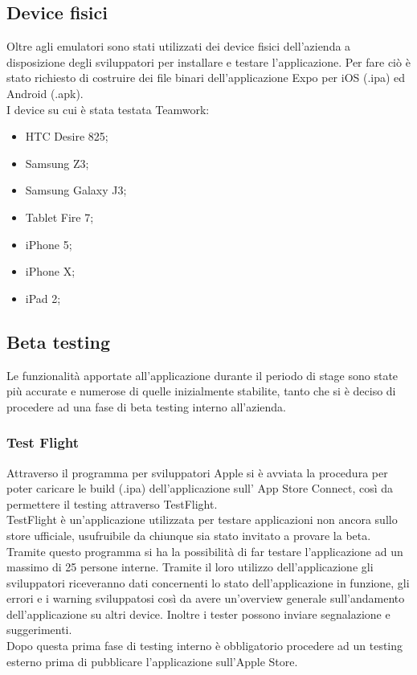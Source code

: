 \subsection{Device fisici}
Oltre agli emulatori sono stati utilizzati dei device fisici dell'azienda a disposizione degli sviluppatori per installare e testare l'applicazione. Per fare ciò è stato richiesto di costruire dei file binari dell'applicazione Expo per iOS (.ipa) ed Android (.apk). \\
I device su cui è stata testata Teamwork:
\begin{itemize}
	\item HTC Desire 825;
	\item Samsung Z3;
	\item Samsung Galaxy J3;
	\item Tablet Fire 7;
	\item iPhone 5;
	\item iPhone X;
	\item iPad 2;
\end{itemize}

\subsection{Beta testing}
Le funzionalità apportate all'applicazione durante il periodo di stage sono state più accurate e numerose di quelle inizialmente stabilite, tanto che si è deciso di procedere ad una fase di beta testing interno all'azienda.\\
\subsubsection{Test Flight}
Attraverso il programma per sviluppatori Apple si è avviata la procedura per poter caricare le build (.ipa) dell'applicazione sull' App Store Connect, così da permettere il testing attraverso TestFlight.\\
TestFlight è un'applicazione utilizzata per testare applicazioni non ancora sullo store ufficiale, usufruibile da chiunque sia stato invitato a provare la beta. Tramite questo programma si ha la possibilità di far testare l'applicazione ad un massimo di 25 persone interne. 
Tramite il loro utilizzo dell'applicazione gli sviluppatori riceveranno dati concernenti lo stato dell'applicazione in funzione, gli errori e i warning sviluppatosi così da avere un'overview generale sull'andamento dell'applicazione su altri device. Inoltre i tester possono inviare segnalazione e suggerimenti. \\
Dopo questa prima fase di testing interno è obbligatorio procedere ad un testing esterno prima di pubblicare l'applicazione sull'Apple Store.
